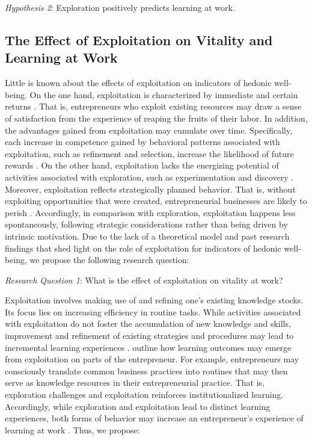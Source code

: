 \documentclass[man]{apa7}
\begin{document}
\textit{Hypothesis 2}: Exploration positively predicts learning at work.

\subsection{The Effect of Exploitation on Vitality and Learning at Work}

Little is known about the effects of exploitation on indicators of hedonic well-being.
On the one hand, exploitation is characterized by immediate and certain returns \parencite{March.1991}.
That is, entrepreneurs who exploit existing resources may draw a sense of satisfaction from the experience of reaping the fruits of their labor. 
In addition, the advantages gained from exploitation may cumulate over time. 
Specifically, each increase in competence gained by behavioral patterns associated with exploitation, such as refinement and selection, increase the likelihood of future rewards \parencite{Argyris.1978, March.1991}.
On the other hand, exploitation lacks the energizing potential of activities associated with exploration, such as experimentation and discovery \parencite{Spreitzer.2005b}.
Moreover, exploitation reflects strategically planned behavior. 
That is, without exploiting opportunities that were created, entrepreneurial businesses are likely to perish \parencite[e.g.,][]{Tushman1996}.
Accordingly, in comparison with exploration, exploitation happens less spontaneously, following strategic considerations rather than being driven by intrinsic motivation. 
Due to the lack of a theoretical model and past research findings that shed light on the role of exploitation for indicators of hedonic well-being, we propose the following research question: \par 

\textit{Research Question 1}: What is the effect of exploitation on vitality at work? \par 
Exploitation involves making use of and refining one’s existing knowledge stocks. 
Its focus lies on increasing efficiency in routine tasks. 
While activities associated with exploitation do not foster the accumulation of new knowledge and skills, improvement and refinement of existing strategies and procedures may lead to incremental learning experiences \parencite[e.g.,][]{March.1991, Kane2007}. 
\textcite{Jansen2009} outline how learning outcomes may emerge from exploitation on parts of the entrepreneur. 
For example, entrepreneurs may consciously translate common business practices into routines that may then serve as knowledge resources in their entrepreneurial practice. 
That is, exploration challenges and exploitation reinforces institutionalized learning.
Accordingly, while exploration and exploitation lead to distinct learning experiences, both forms of behavior may increase an entrepreneur's experience of learning at work \parencite{Jansen2009}. 
Thus, we propose:
\end{document}
